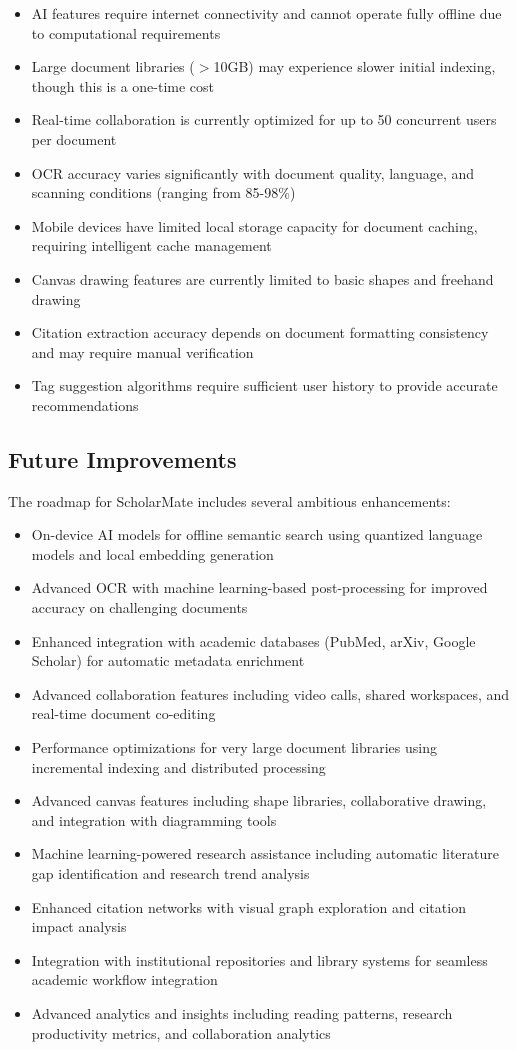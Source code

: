 \documentclass[conference]{IEEEtran}
\begin{document}
\begin{itemize}
\item AI features require internet connectivity and cannot operate fully offline due to computational requirements
\item Large document libraries ($>$10GB) may experience slower initial indexing, though this is a one-time cost
\item Real-time collaboration is currently optimized for up to 50 concurrent users per document
\item OCR accuracy varies significantly with document quality, language, and scanning conditions (ranging from 85-98\%)
\item Mobile devices have limited local storage capacity for document caching, requiring intelligent cache management
\item Canvas drawing features are currently limited to basic shapes and freehand drawing
\item Citation extraction accuracy depends on document formatting consistency and may require manual verification
\item Tag suggestion algorithms require sufficient user history to provide accurate recommendations
\end{itemize}

\subsection{Future Improvements}

The roadmap for ScholarMate includes several ambitious enhancements:

\begin{itemize}
\item On-device AI models for offline semantic search using quantized language models and local embedding generation
\item Advanced OCR with machine learning-based post-processing for improved accuracy on challenging documents
\item Enhanced integration with academic databases (PubMed, arXiv, Google Scholar) for automatic metadata enrichment
\item Advanced collaboration features including video calls, shared workspaces, and real-time document co-editing
\item Performance optimizations for very large document libraries using incremental indexing and distributed processing
\item Advanced canvas features including shape libraries, collaborative drawing, and integration with diagramming tools
\item Machine learning-powered research assistance including automatic literature gap identification and research trend analysis
\item Enhanced citation networks with visual graph exploration and citation impact analysis
\item Integration with institutional repositories and library systems for seamless academic workflow integration
\item Advanced analytics and insights including reading patterns, research productivity metrics, and collaboration analytics
\end{itemize}
\end{document}
